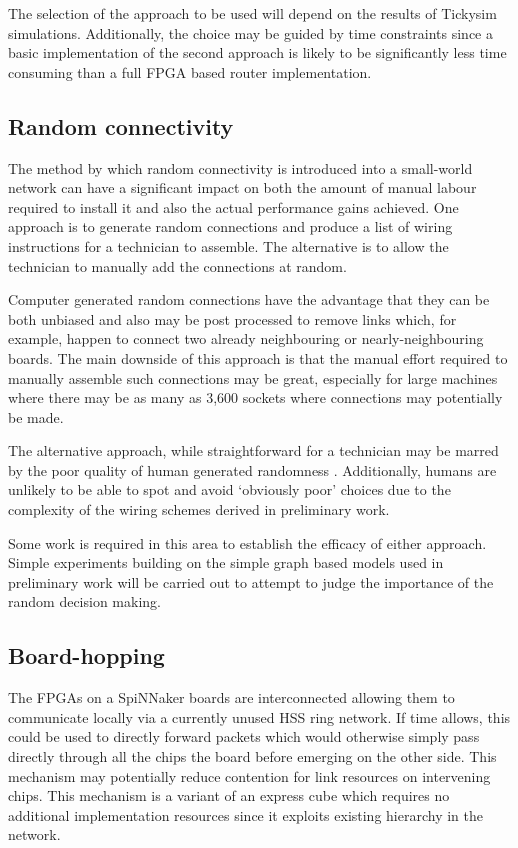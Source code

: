 			The selection of the approach to be used will depend on the results of
			Tickysim simulations. Additionally, the choice may be guided by time
			constraints since a basic implementation of the second approach is likely
			to be significantly less time consuming than a full FPGA based router
			implementation.
		
		\subsection{Random connectivity}
			
			The method by which random connectivity is introduced into a small-world
			network can have a significant impact on both the amount of manual labour
			required to install it and also the actual performance gains achieved. One
			approach is to generate random connections and produce a list of wiring
			instructions for a technician to assemble. The alternative is to allow the
			technician to manually add the connections at random.
			
			Computer generated random connections have the advantage that they can be
			both unbiased and also may be post processed to remove links which, for
			example, happen to connect two already neighbouring or nearly-neighbouring
			boards. The main downside of this approach is that the manual effort
			required to manually assemble such connections may be great, especially
			for large machines where there may be as many as 3,600 sockets where
			connections may potentially be made.
			
			The alternative approach, while straightforward for a technician may be
			marred by the poor quality of human generated randomness
			\cite{figurska08}. Additionally, humans are unlikely to be able to spot
			and avoid `obviously poor' choices due to the complexity of the wiring
			schemes derived in preliminary work.
			
			Some work is required in this area to establish the efficacy of either
			approach. Simple experiments building on the simple graph based models
			used in preliminary work will be carried out to attempt to judge the
			importance of the random decision making.
		
		\subsection{Board-hopping}
			
			
			The FPGAs on a SpiNNaker boards are interconnected allowing them to
			communicate locally via a currently unused HSS ring network. If time
			allows, this could be used to directly forward packets which would
			otherwise simply pass directly through all the chips the board before
			emerging on the other side. This mechanism may potentially reduce
			contention for link resources on intervening chips. This mechanism is a
			variant of an express cube \cite{dally91} which requires no additional
			implementation resources since it exploits existing hierarchy in the
			network.
		
